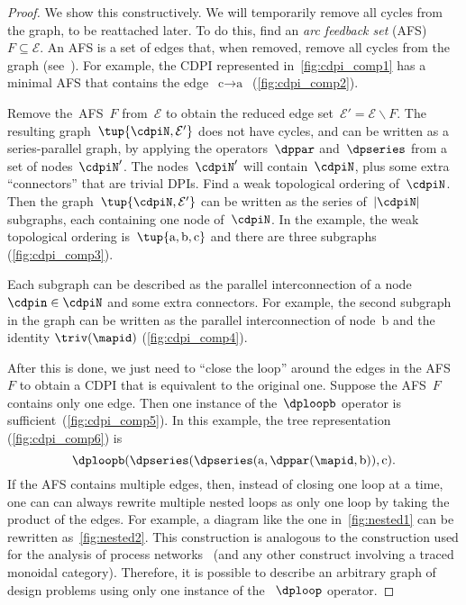 \begin{proof}
	We show this constructively.
	We will temporarily remove all cycles from the graph, to be reattached later.
	To do this, find an \emph{arc feedback set} (AFS) $F\subseteq\mathcal{E}$.
	An AFS is a set of edges that, when removed, remove all cycles from the graph (see~\cite{golovach15incremental}).
	For example, the CDPI represented in~\cref{fig:cdpi_comp1} has a minimal AFS that contains the edge~$\text{c}\rightarrow\text{a}$~(\cref{fig:cdpi_comp2}).

	Remove the~AFS~$F$ from~$\mathcal{E}$ to obtain the reduced edge set~$\mathcal{E}'=\mathcal{E}\backslash F$.
	The resulting graph~$\tup{ \cdpiN,\mathcal{E}'} $ does not have cycles, and can be written as a series-parallel graph, by applying the operators~$\dppar$ and~$\dpseries$ from a set of nodes~$\cdpiN'$.
	The nodes~$\cdpiN'$ will contain~$\cdpiN$, plus some extra ``connectors'' that are trivial DPIs.
	Find a weak topological ordering of~$\cdpiN$.
	Then the graph~$\tup{ \cdpiN,\mathcal{E}'} $ can be written as the series of~$|\cdpiN|$ subgraphs, each containing one node of~$\cdpiN$.
	In the example, the weak topological ordering is~$\tup{ \text{a},\text{b},\text{c}} $ and there are three subgraphs (\cref{fig:cdpi_comp3}).


	Each subgraph can be described as the parallel interconnection of a node~$\cdpin\in\cdpiN$ and some extra connectors.
	For example, the second subgraph in the graph can be written as the parallel interconnection of node~$\text{b}$ and the identity $\triv(\mapid)$ (\cref{fig:cdpi_comp4}).


	After this is done, we just need to ``close the loop'' around the edges in the AFS~$F$ to obtain a CDPI that is equivalent to the original one.
	Suppose the AFS~$F$ contains only one edge.
	Then one instance of the~$\dploopb$ operator is sufficient~(\cref{fig:cdpi_comp5}).
	In this example, the tree representation (\cref{fig:cdpi_comp6}) is
	\begin{equation*}
		\dploopb(\dpseries(\dpseries(\text{a},\dppar(\mapid,\text{b})),\text{c}).
	\end{equation*}
	If the AFS contains multiple edges, then, instead of closing one loop at a time, one can can always rewrite multiple nested loops as only one loop by taking the product of the edges.
	For example, a diagram like the one in~\cref{fig:nested1} can be rewritten as~\cref{fig:nested2}.
	This construction is analogous to the construction used for the analysis of process networks~\cite{lee10} (and any other construct involving a traced monoidal category).
	Therefore, it is possible to describe an arbitrary graph of design problems using only one instance of the ~$\dploop$ operator.
\end{proof}

